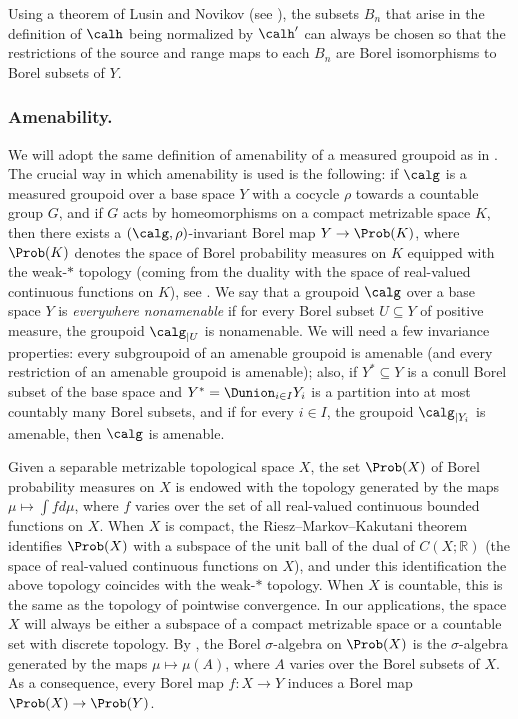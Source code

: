 Using a theorem of Lusin and Novikov (see \cite[Th.\,18.10]{Kec}), the subsets $B_n$ that arise in the definition of $\calh$ being normalized by $\calh'$ can always be chosen so that the restrictions of the source and range maps to each $B_n$ are Borel isomorphisms to Borel subsets of $Y$.

\subsubsection*{Amenability.}

We will adopt the same definition of amenability of a measured groupoid as in \cite{Kid-survey}. The crucial way in which amenability is used is the following: if $\calg$ is a measured groupoid over a base space $Y$ with a cocycle $\rho$ towards a countable group $G$, and if $G$ acts by homeomorphisms on a compact metrizable space $K$, then there exists a $(\calg,\rho)$-invariant Borel map $Y\to\Prob(K)$, where $\Prob(K)$ denotes the space of Borel probability measures on $K$ equipped with the weak-$*$ topology (coming from the duality with the space of real-valued continuous functions on $K$), see \cite[Prop.\,4.14]{Kid-survey}. We say that a groupoid $\calg$ over a base space $Y$ is \emph{everywhere nonamenable} if for every Borel subset $U\subseteq Y$ of positive measure, the groupoid $\calg_{|U}$ is nonamenable. We will need a few invariance properties: every subgroupoid of an amenable groupoid is amenable \cite[Th.\,4.16]{Kid-survey} (and every restriction of an amenable groupoid is amenable); also, if $Y^*\subseteq Y$ is a conull Borel subset of the base space and $Y^*=\Dunion_{i\in I} Y_i$ is a partition into at most countably many Borel subsets, and if for every $i\in I$, the groupoid $\calg_{|Y_i}$ is amenable, then $\calg$ is amenable.

\begin{rk}
\label{rk:Borel}
Given a separable metrizable topological space $X$, the set $\Prob(X)$ of Borel probability measures on $X$ is endowed with the topology generated by the maps $\mu\mapsto\int fd\mu$, where $f$ varies over the set of all real-valued continuous bounded functions on $X$. When $X$ is compact, the Riesz--Markov--Kakutani theorem identifies $\Prob(X)$ with a subspace of the unit ball of the dual of $C(X;\mathbb{R})$ (the space of real-valued continuous functions on $X$), and under this identification the above topology coincides with the weak-$*$ topology. When $X$ is countable, this is the same as the topology of pointwise convergence. In our applications, the space $X$ will always be either a subspace of a compact metrizable space or a countable set with discrete topology. By \cite[Th.\,17.24]{Kec}, the Borel $\sigma$-algebra on $\Prob(X)$ is the $\sigma$-algebra generated by the maps $\mu\mapsto\mu(A)$, where $A$ varies over the Borel subsets of $X$. As a consequence, every Borel map $f:X\to Y$ induces a Borel map $\Prob(X)\to\Prob(Y)$.
\end{rk}

